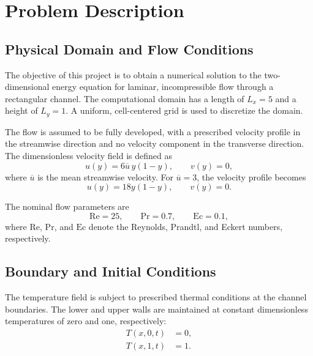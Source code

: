 \section{Problem Description}
\label{sec:problem_description}

\subsection{Physical Domain and Flow Conditions}

The objective of this project is to obtain a numerical solution
to the two-dimensional energy equation for laminar, incompressible
flow through a rectangular channel. The computational domain has
a length of $L_x=5$ and a height of $L_y=1$. A uniform,
cell-centered grid is used to discretize the domain.

The flow is assumed to be fully developed, with a prescribed
velocity profile in the streamwise direction and no velocity
component in the transverse direction. The dimensionless velocity
field is defined as
\begin{equation}
u(y)=6\overline{u}\,y(1-y),
\qquad
v(y)=0,
\label{eq:velocity_profile}
\end{equation}
where $\overline{u}$ is the mean streamwise velocity. For
$\overline{u}=3$, the velocity profile becomes
\begin{equation}
\boxed{
u(y)=18y(1-y),
\qquad v(y)=0.
}
\label{eq:velocity_profile_expanded}
\end{equation}

The nominal flow parameters are
\begin{equation}
\mathrm{Re}=25,
\qquad
\mathrm{Pr}=0.7,
\qquad
\mathrm{Ec}=0.1,
\label{eq:nominal_parameters}
\end{equation}
where $\mathrm{Re}$, $\mathrm{Pr}$, and $\mathrm{Ec}$ denote
the Reynolds, Prandtl, and Eckert numbers, respectively.

\subsection{Boundary and Initial Conditions}

The temperature field is subject to prescribed thermal
conditions at the channel boundaries. The lower and upper
walls are maintained at constant dimensionless temperatures
of zero and one, respectively:
\begin{align}
T(x,0,t)&=0,
\label{eq:bottom_wall_condition}
\\
T(x,1,t)&=1.
\label{eq:top_wall_condition}
\end{align}


